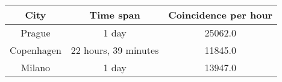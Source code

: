 \begin{tabular}{ccc}
\toprule
City & Time span & Coincidence per hour\\
\midrule
Prague & 1 day & 25062.0\\
Copenhagen & 22 hours, 39 minutes & 11845.0\\
Milano & 1 day & 13947.0\\
\bottomrule
\end{tabular}
